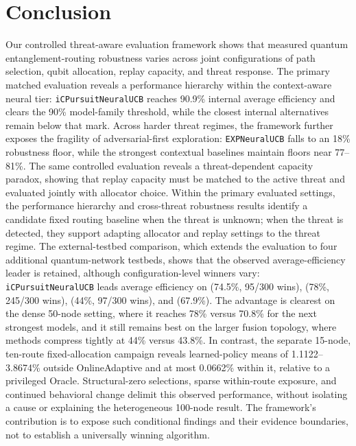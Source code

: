 \section{Conclusion}
\label{sec:conclusion}

Our controlled threat-aware evaluation framework shows that measured quantum
entanglement-routing robustness varies across joint configurations
of path selection, qubit allocation, replay capacity, and threat response. The
primary matched evaluation reveals a performance hierarchy within the context-aware neural
tier: \texttt{iCPursuitNeuralUCB} reaches 90.9\% internal average efficiency and
clears the 90\% model-family threshold, while the closest internal alternatives
remain below that mark. Across harder threat regimes, the framework further
exposes the fragility of adversarial-first exploration: \texttt{EXPNeuralUCB}
falls to an 18\% robustness floor, while the strongest contextual baselines
maintain floors near 77--81\%. The same controlled evaluation reveals a
threat-dependent capacity paradox, showing that replay capacity must be matched to
the active threat and evaluated jointly with allocator choice.
Within the primary evaluated settings, the performance hierarchy and cross-threat
robustness results identify a candidate fixed routing baseline when the threat is
unknown; when the threat is detected, they support adapting allocator and replay
settings to the threat regime. The external-testbed comparison, which extends the
evaluation to four additional quantum-network testbeds, shows that the observed
average-efficiency leader is retained, although configuration-level winners vary:
\texttt{iCPursuitNeuralUCB} leads average efficiency on \paperTwo{} (74.5\%,
95/300 wins), \paperSeven{} (78\%, 245/300 wins), \paperTwelve{} (44\%,
97/300 wins), and \paperEight{} (67.9\%). The advantage is clearest on the dense
50-node \paperSeven{} setting, where it reaches 78\% versus 70.8\% for the next
strongest models, and it still remains best on the larger \paperTwelve{} fusion
topology, where methods compress tightly at 44\% versus 43.8\%. In contrast,
the separate 15-node, ten-route fixed-allocation campaign reveals learned-policy
means of 1.1122--3.8674\% outside OnlineAdaptive and at most 0.0662\% within it,
relative to a privileged Oracle. Structural-zero selections, sparse within-route
exposure, and continued behavioral change delimit this observed performance,
without isolating a cause or explaining the heterogeneous 100-node result.
The framework's contribution is to expose such conditional findings and their
evidence boundaries, not to establish a universally winning algorithm.

